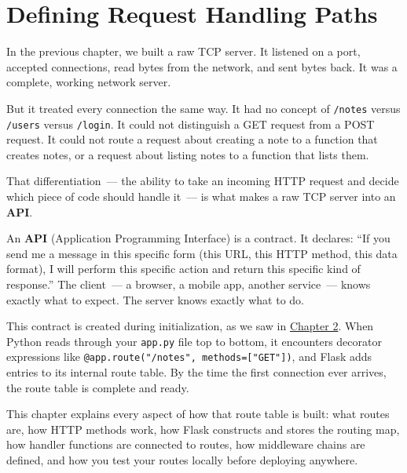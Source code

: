 \setcounter{chapter}{3}
\chapter{Defining Request Handling Paths}\label{ch:04-request-handling-paths}


\chapterrule

In the previous chapter, we built a raw TCP server. It listened on a port, accepted connections, read bytes from the network, and sent bytes back. It was a complete, working network server.

But it treated every connection the same way. It had no concept of \texttt{/notes} versus \texttt{/users} versus \texttt{/login}. It could not distinguish a GET request from a POST request. It could not route a request about creating a note to a function that creates notes, or a request about listing notes to a function that lists them.

That differentiation~--- the ability to take an incoming HTTP request and decide which piece of code should handle it~--- is what makes a raw TCP server into an \textbf{API}.

An \textbf{API} (Application Programming Interface) is a contract. It declares: ``If you send me a message in this specific form (this URL, this HTTP method, this data format), I will perform this specific action and return this specific kind of response.'' The client~--- a browser, a mobile app, another service~--- knows exactly what to expect. The server knows exactly what to do.

This contract is created during initialization, as we saw in \hyperref[ch:02-runtime-initialization]{Chapter 2}. When Python reads through your \texttt{app.py} file top to bottom, it encounters decorator expressions like \texttt{@app.}\allowbreak{}\texttt{route("/}\allowbreak{}\texttt{notes",}\allowbreak{}\texttt{\ methods=}\allowbreak{}\texttt{{[}"GET"{]})}, and Flask adds entries to its internal route table. By the time the first connection ever arrives, the route table is complete and ready.

This chapter explains every aspect of how that route table is built: what routes are, how HTTP methods work, how Flask constructs and stores the routing map, how handler functions are connected to routes, how middleware chains are defined, and how you test your routes locally before deploying anywhere.

